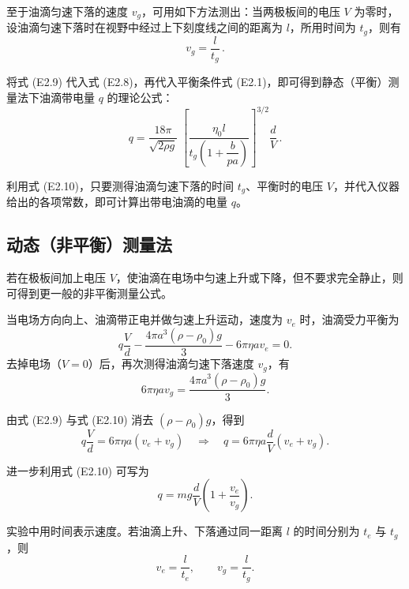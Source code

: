 \documentclass[a4paper,8pt,twocolumn]{article}
\begin{document}
至于油滴匀速下落的速度 $v_g$，可用如下方法测出：当两极板间的电压 $V$ 为零时，设油滴匀速下落时在视野中经过上下刻度线之间的距离为 $l$，所用时间为 $t_g$，则有
\begin{equation}
v_g = \frac{l}{t_g} \,.
\tag{E2.9}
\end{equation}

将式 (E2.9) 代入式 (E2.8)，再代入平衡条件式 (E2.1)，即可得到静态（平衡）测量法下油滴带电量 $q$ 的理论公式：
\begin{equation}
q = \frac{18\pi}{\sqrt{2\rho g}}\;
    \left[
      \frac{\eta_0 l}{t_g\!\left(1 + \dfrac{b}{pa}\right)}
    \right]^{\!3/2}
    \frac{d}{V} \,.
\tag{E2.10}
\end{equation}

利用式 (E2.10)，只要测得油滴匀速下落的时间 $t_g$、平衡时的电压 $V$，并代入仪器给出的各项常数，即可计算出带电油滴的电量 $q$。

\subsection{动态（非平衡）测量法}

若在极板间加上电压 $V$，使油滴在电场中匀速上升或下降，但不要求完全静止，则可得到更一般的非平衡测量公式。

当电场方向向上、油滴带正电并做匀速上升运动，速度为 $v_e$ 时，油滴受力平衡为
\begin{equation}
q\frac{V}{d}-\frac{4\pi a^{3}(\rho-\rho_0)g}{3}
-6\pi\eta a v_e=0.
\tag{E2.9}
\end{equation}
去掉电场（$V=0$）后，再次测得油滴匀速下落速度 $v_g$，有
\begin{equation}
6\pi\eta a v_g=\frac{4\pi a^{3}(\rho-\rho_0)g}{3}.
\tag{E2.10}
\end{equation}

由式 (E2.9) 与式 (E2.10) 消去 $(\rho-\rho_0)g$，得到
\begin{equation}
q\frac{V}{d}=6\pi\eta a(v_e+v_g)
\quad\Rightarrow\quad
q=6\pi\eta a\frac{d}{V}(v_e+v_g).
\tag{E2.11}
\end{equation}

进一步利用式 (E2.10) 可写为
\begin{equation}
q=mg\frac{d}{V}\left(1+\frac{v_e}{v_g}\right).
\tag{E2.12}
\end{equation}

实验中用时间表示速度。若油滴上升、下落通过同一距离 $l$ 的时间分别为 $t_e$ 与 $t_g$，则
\begin{equation}
v_e=\frac{l}{t_e},\qquad
v_g=\frac{l}{t_g}.
\tag{E2.13}
\end{equation}
\end{document}
